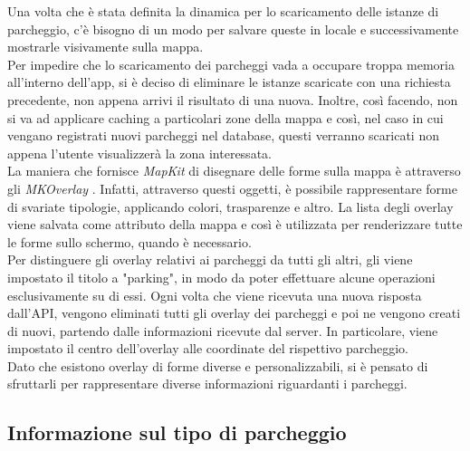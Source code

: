 Una volta che è stata definita la dinamica per lo scaricamento delle istanze di 
parcheggio, c'è bisogno di un modo per salvare queste in locale e successivamente 
mostrarle visivamente sulla mappa.\\
Per impedire che lo scaricamento dei parcheggi vada a occupare troppa memoria 
all'interno dell'app, si è deciso di eliminare le istanze scaricate con una 
richiesta precedente, non appena arrivi il risultato di una nuova. Inoltre, 
così facendo, non si va ad applicare caching a particolari zone della mappa
e così, nel caso in cui vengano registrati nuovi parcheggi nel database, questi 
verranno scaricati non appena l'utente visualizzerà la zona interessata.\\
La maniera che fornisce \emph{MapKit} di disegnare delle forme sulla mappa è 
attraverso gli \emph{MKOverlay} \cite{displaying_objects_map}. Infatti, 
attraverso questi oggetti, è possibile
rappresentare forme di svariate tipologie, applicando colori, trasparenze e altro.
La lista degli overlay viene salvata come attributo della mappa e così 
è utilizzata per renderizzare tutte le forme sullo schermo, quando è necessario.\\
Per distinguere gli overlay relativi ai parcheggi da tutti gli altri, gli 
viene impostato il titolo a "parking", in modo da poter effettuare alcune operazioni 
esclusivamente su di essi. Ogni volta che viene ricevuta una nuova risposta dall'API, 
vengono eliminati tutti gli overlay dei parcheggi e poi ne vengono creati 
di nuovi, partendo dalle informazioni ricevute dal server. In particolare, viene 
impostato il centro dell'overlay alle coordinate del rispettivo parcheggio.\\
Dato che esistono overlay di forme diverse e personalizzabili, si è pensato di 
sfruttarli per rappresentare diverse informazioni riguardanti i parcheggi.

\subsection{Informazione sul tipo di parcheggio} 

